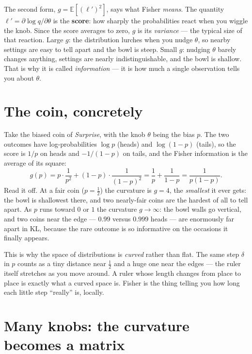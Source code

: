 \documentclass[11pt]{article}
\begin{document}
\begin{insight}
The second form, $g = \mathbb{E}[(\ell')^2]$, says what Fisher \emph{means}. The quantity
$\ell' = \partial \log q / \partial\theta$ is the \textbf{score}: how sharply the probabilities
react when you wiggle the knob. Since the score averages to zero, $g$ is its \emph{variance} ---
the typical size of that reaction. Large $g$: the distribution lurches when you nudge $\theta$,
so nearby settings are easy to tell apart and the bowl is steep. Small $g$: nudging $\theta$
barely changes anything, settings are nearly indistinguishable, and the bowl is shallow. That is
why it is called \emph{information} --- it is how much a single observation tells you about
$\theta$.
\end{insight}

\section{The coin, concretely}

Take the biased coin of \emph{Surprise}, with the knob $\theta$ being the bias $p$. The two
outcomes have log-probabilities $\log p$ (heads) and $\log(1-p)$ (tails), so the score is $1/p$
on heads and $-1/(1-p)$ on tails, and the Fisher information is the average of its square:
\[
  g(p) = p\cdot\frac{1}{p^2} + (1-p)\cdot\frac{1}{(1-p)^2}
       = \frac1p + \frac{1}{1-p}
       = \frac{1}{p(1-p)}.
\]
Read it off. At a fair coin ($p = \tfrac12$) the curvature is $g = 4$, the \emph{smallest} it
ever gets: the bowl is shallowest there, and two nearly-fair coins are the hardest of all to
tell apart. As $p$ runs toward $0$ or $1$ the curvature $g \to \infty$: the bowl walls go
vertical, and two coins near the edge --- $0.99$ versus $0.999$ heads --- are enormously far
apart in KL, because the rare outcome is so informative on the occasions it finally appears.

\begin{insight}
This is why the space of distributions is \emph{curved} rather than flat. The same step $\delta$
in $p$ counts as a tiny distance near $\tfrac12$ and a huge one near the edges --- the ruler
itself stretches as you move around. A ruler whose length changes from place to place is exactly
what a curved space is. Fisher is the thing telling you how long each little step ``really'' is,
locally.
\end{insight}

\section{Many knobs: the curvature becomes a matrix}
\end{document}
